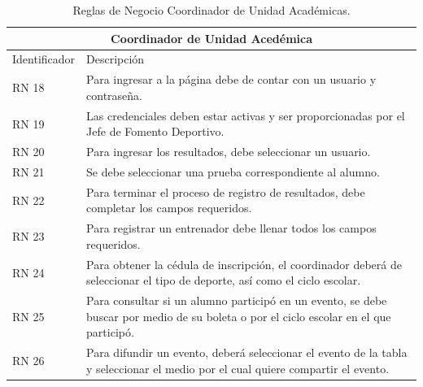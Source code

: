 \begin{table}[hbt!]
	\begin{center}
		\begin{tabular}{|p{30mm}|p{100mm}|}
			\hline
			\multicolumn{2}{|c|}{Coordinador de Unidad Acedémica} \\
			\hline
			Identificador & Descripción \\
			\hline 
			RN 18 &  Para ingresar a la página debe de contar con un usuario y contraseña.\\ \hline
			RN 19 & Las credenciales deben estar activas y ser proporcionadas por el Jefe de Fomento Deportivo.\\ \hline
			RN 20 & Para ingresar los resultados, debe seleccionar un usuario. \\ \hline
			RN 21 & Se debe seleccionar una prueba correspondiente al alumno.\\ \hline
			RN 22 & Para terminar el proceso de registro de resultados, debe completar los campos requeridos. \\ \hline
			RN 23 & Para registrar un entrenador debe llenar todos los campos requeridos.\\ \hline
			RN 24 & Para obtener la cédula de inscripción, el coordinador deberá de seleccionar el tipo de deporte, así como el ciclo escolar. \\ \hline
			RN 25 & Para consultar si un alumno participó en un evento, se debe buscar por medio de su boleta o por el ciclo escolar en el que participó.\\ \hline
			RN 26 & Para difundir un evento, deberá seleccionar el evento de la tabla y seleccionar el medio por el cual quiere compartir el evento.\\ \hline
		\end{tabular}
		\caption{Reglas de Negocio Coordinador de Unidad Académicas.}
		\label{RNCUA}
	\end{center}
\end{table}

\pagebreak

